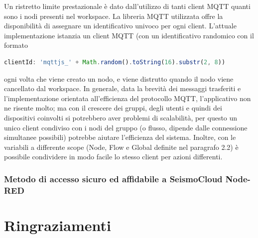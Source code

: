 \documentclass[a4paper,10pt]{memoir}
\begin{document}
Un ristretto limite prestazionale è dato dall'utilizzo di tanti client MQTT quanti sono i nodi presenti nel workspace. La libreria MQTT utilizzata offre la disponibilità di assegnare un identificativo univoco per ogni client.
L'attuale implementazione istanzia un client MQTT (con un identificativo randomico con il formato 
\begin{lstlisting}[language=Javascript]
clientId: 'mqttjs_' + Math.random().toString(16).substr(2, 8))
\end{lstlisting}
ogni volta che viene creato un nodo, e viene distrutto quando il nodo viene cancellato dal workspace.
In generale, data la brevità dei messaggi trasferiti e l'implementazione orientata all'efficienza del protocollo MQTT, l'applicativo non ne risente molto; ma con il crescere dei gruppi, degli utenti e quindi dei dispositivi coinvolti si potrebbero aver problemi di scalabilità, per questo un unico client condiviso con i nodi del gruppo (o flusso, dipende dalle connessione simultanee possibili) potrebbe aiutare l'efficienza del sistema.
Inoltre, con le variabili a differente scope (Node, Flow e Global definite nel paragrafo 2.2) è possibile condividere in modo facile lo stesso client per azioni differenti.

\subsection{Metodo di accesso sicuro ed affidabile a SeismoCloud Node-RED}

\clearpage


\chapter*{Ringraziamenti}

\cleardoublepage

\end{document}
